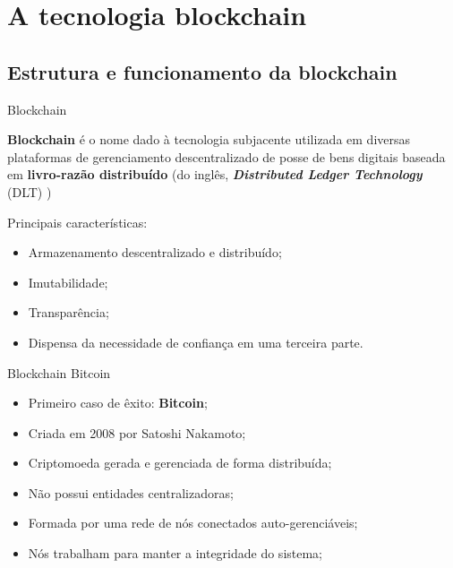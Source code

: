 \section{A tecnologia blockchain}
\subsection{Estrutura e funcionamento da blockchain}

\begin{frame}{Blockchain}
    \begin{block}{}
    \textbf{Blockchain} é o nome dado à tecnologia subjacente utilizada em diversas plataformas
    de gerenciamento descentralizado de posse de bens digitais baseada em \textbf{livro-razão distribuído}
    (do inglês, \textbf{\textit{Distributed Ledger Technology}} (DLT) )
    \end{block}
    Principais características:
    \begin{itemize}
        \item Armazenamento descentralizado e distribuído;
        \item Imutabilidade;
        \item Transparência;
        \item Dispensa da necessidade de confiança em uma terceira parte.
    \end{itemize}
\end{frame}

\begin{frame}{Blockchain Bitcoin}
    \begin{itemize}
        \item Primeiro caso de êxito: \textbf{Bitcoin};%
            \item Criada em 2008 por Satoshi Nakamoto;
            \item Criptomoeda gerada e gerenciada de forma distribuída;
            \item Não possui entidades centralizadoras;
            \item Formada por uma rede de nós conectados auto-gerenciáveis;
            \item Nós trabalham para manter a integridade do sistema;
    \end{itemize}  
\end{frame}


